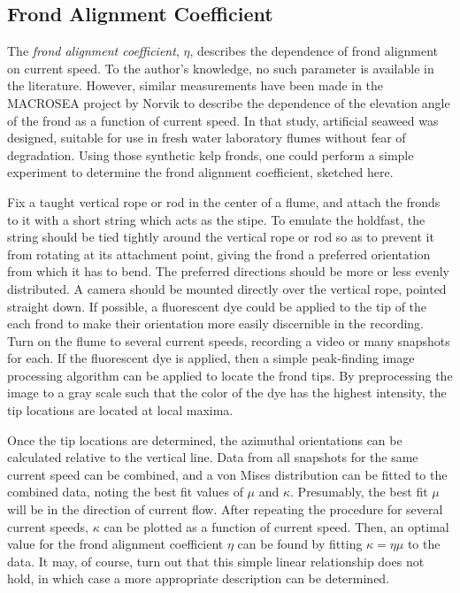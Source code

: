 \subsection{Frond Alignment Coefficient}
The \textit{frond alignment coefficient}, $\eta$, describes the dependence of frond alignment on current speed.
To the author's knowledge, no such parameter is available in the literature.
However, similar measurements have been made in the MACROSEA project by Norvik \cite{norvik_design_2017} to describe
the dependence of the elevation angle of the frond as a function of current speed.
In that study, artificial seaweed was designed, suitable for use in fresh water laboratory flumes without fear of degradation.
Using those synthetic kelp fronds, one could perform a simple experiment to determine the frond alignment coefficient, sketched here.

Fix a taught vertical rope or rod in the center of a flume, and attach the fronds to it with a short string which acts as the stipe.
To emulate the holdfast, the string should be tied tightly around the vertical rope or rod so as to prevent it from rotating at its attachment point,
giving the frond a preferred orientation from which it has to bend.
The preferred directions should be more or less evenly distributed.
A camera should be mounted directly over the vertical rope, pointed straight down.
If possible, a fluorescent dye could be applied to the tip of the each frond to make their orientation more easily discernible in the recording.
Turn on the flume to several current speeds, recording a video or many snapshots for each.
If the fluorescent dye is applied, then a simple peak-finding image processing algorithm can be applied to locate the frond tips.
By preprocessing the image to a gray scale such that the color of the dye has the highest intensity,
the tip locations are located at local maxima.

Once the tip locations are determined, the azimuthal orientations can be calculated relative to the vertical line.
Data from all snapshots for the same current speed can be combined, and a von Mises distribution can be fitted to the combined data,
noting the best fit values of $\mu$ and $\kappa$.
Presumably, the best fit $\mu$ will be in the direction of current flow.
After repeating the procedure for several current speeds, $\kappa$ can be plotted as a function of current speed.
Then, an optimal value for the frond alignment coefficient $\eta$ can be found by fitting $\kappa = \eta\mu$ to the data.
It may, of course, turn out that this simple linear relationship does not hold, in which case a more appropriate description can be determined.

